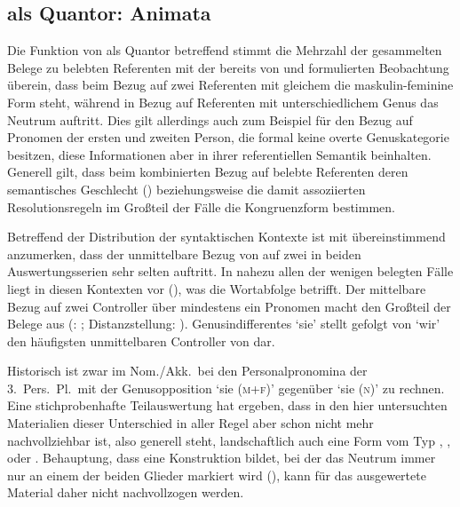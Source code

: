 \subsection{ als Quantor: Animata}

Die Funktion von  als Quantor betreffend stimmt die Mehrzahl der
gesammelten Belege zu belebten Referenten mit der bereits von
\citet[312]{grimm1890} und \citet[39--41]{behaghel1928} formulierten
Beobachtung überein, dass beim Bezug auf zwei Referenten mit gleichem
 die maskulin-feminine Form steht, während in Bezug auf Referenten
mit unterschiedlichem Genus das Neutrum auftritt. Dies gilt allerdings
auch zum Beispiel für den Bezug auf Pronomen der ersten und zweiten Person, die
formal keine overte Genuskategorie besitzen, diese
Informationen aber in ihrer referentiellen Semantik beinhalten. Generell gilt,
dass beim kombinierten Bezug auf belebte Referenten deren semantisches
Geschlecht () beziehungsweise die damit assoziierten
Resolutionsregeln im Großteil der Fälle die Kongruenzform bestimmen.

Betreffend der Distribution der syntaktischen
Kontexte ist mit \citet[624, Abbildung
P~179]{ksw2} übereinstimmend anzumerken, dass der unmittelbare
Bezug von  auf zwei  in beiden Auswertungsserien
sehr selten auftritt. In nahezu allen der wenigen belegten Fälle liegt in
diesen Kontexten  vor (), was die Wortabfolge betrifft. Der
mittelbare Bezug auf zwei Controller über mindestens ein Pronomen macht den
Großteil der Belege aus (: ; Distanzstellung: ).
Genus\-indifferentes  `sie' stellt gefolgt von
 `wir' den häufigsten unmittelbaren Controller von  dar.

Historisch ist zwar im Nom./Akk.\ bei den
Personalpronomina der 3.~Pers.\ Pl.\ mit der
Genus\-opposition  `sie (\textsc{m+f})' gegenüber  `sie
(\textsc{n})' zu rechnen. Eine stichprobenhafte Teilauswertung
hat ergeben, dass in den hier untersuchten Materialien dieser Unterschied in
aller Regel aber schon nicht mehr nachvollziehbar ist, also generell 
steht, landschaftlich auch eine Form vom Typ
,
,
 oder
\autocites[vgl.][213--214]{paul2007}[369, 390--397]{ksw2}[482--483]{wmu1}.
 Behauptung, dass  eine
Konstruktion bildet, bei der das Neutrum immer nur an einem der beiden Glieder
markiert wird (), kann für das ausgewertete Material daher
nicht nachvollzogen werden.

